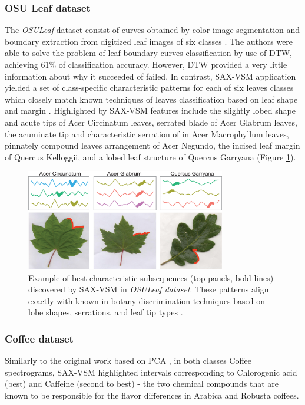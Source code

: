 \documentclass[conference]{IEEEtran}
\begin{document}
\subsubsection{OSU Leaf dataset}
The \textit{OSULeaf} dataset consist of curves obtained by color image segmentation 
and boundary extraction from digitized leaf images of six classes \cite{osuleaf}.
The authors were able to solve the problem of leaf boundary curves classification 
by use of DTW, achieving 61\% of classification accuracy. 
However, DTW provided a very little information about why it succeeded of failed. 
In contrast, SAX-VSM application yielded a set of class-specific characteristic 
patterns for each of six leaves classes which closely match known techniques 
of leaves classification based on leaf shape and margin \cite{dirr}. 
Highlighted by SAX-VSM features include the slightly lobed shape and acute tips of
Acer Circinatum leaves, serrated blade of Acer Glabrum leaves, the acuminate tip and characteristic
serration of in Acer Macrophyllum leaves, pinnately compound leaves arrangement of Acer Negundo, the
incised leaf margin of Quercus Kelloggii, and a lobed leaf structure of Quercus Garryana 
(Figure \ref{fig:shapelet-acer-patterns}).

\begin{figure}[t]
   \centering
   \vspace{-0.2cm}
   \includegraphics[width=87mm]{figures/AcerCircunatum-short.eps}
   \caption{Example of best characteristic subsequences (top panels, bold lines) discovered 
   by SAX-VSM in \textit{OSULeaf dataset}.
    These patterns align exactly with known in botany discrimination techniques based on lobe shapes, 
    serrations, and leaf tip types \cite{dirr}.}
   \label{fig:shapelet-acer-patterns}
   \vspace{-0.2cm}
\end{figure}

\subsubsection{Coffee dataset}
Similarly to the original work based on PCA \cite{coffee}, in both classes Coffee spectrograms, 
SAX-VSM highlighted intervals corresponding to Chlorogenic acid (best) and Caffeine 
(second to best) - the two chemical compounds that are known to be responsible for the flavor 
differences in Arabica and Robusta coffees.
\end{document}
